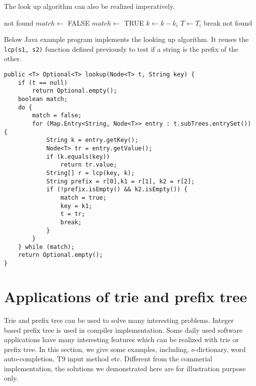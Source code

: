 \documentclass{article}
\begin{document}
The look up algorithm can also be realized imperatively.

\begin{algorithmic}[1]
     \State \Return not found
   \EndIf
  \Repeat
    \State $match \gets$ FALSE
        \State \Return {}
      \EndIf
        \State $match \gets$ TRUE
        \State $k \gets k - k_i$
        \State $T \gets T_i$
        \State break
      \EndIf
    \EndFor
  \State \Return not found
\EndFunction
\end{algorithmic}

Below Java example program implements the looking up algorithm.
It reuses the \texttt{lcp(s1, s2)} function
defined previously to test if a string is the prefix of the other.

\lstset{language=Java}
\begin{lstlisting}
public <T> Optional<T> lookup(Node<T> t, String key) {
    if (t == null)
        return Optional.empty();
    boolean match;
    do {
        match = false;
        for (Map.Entry<String, Node<T>> entry : t.subTrees.entrySet()) {
            String k = entry.getKey();
            Node<T> tr = entry.getValue();
            if (k.equals(key))
                return tr.value;
            String[] r = lcp(key, k);
            String prefix = r[0],k1 = r[1], k2 = r[2];
            if (!prefix.isEmpty() && k2.isEmpty()) {
                match = true;
                key = k1;
                t = tr;
                break;
            }
        }
    } while (match);
    return Optional.empty();
}
\end{lstlisting}

\section{Applications of trie and prefix tree}

Trie and prefix tree can be used to solve many interesting problems.
Integer based prefix tree is used in compiler implementation. Some daily
used software applications have many interesting features which can be
realized with trie or prefix tree. In this section, we give some examples,
including, e-dictionary, word auto-completion, T9
input method etc. Different from the commerial implementation, the
solutions we demonstrated here are for illustration purpose
only.
\end{document}

